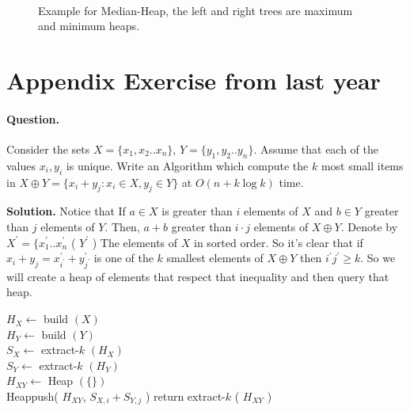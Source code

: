 \begin{figure}[h]
  \centering
  \begin{subfigure}[b]{0.9\textwidth}
	
  \end{subfigure}
  \\ 
\begin{subfigure}[b]{0.9\textwidth}
	
  \end{subfigure}
  \caption{ Example for Median-Heap, the left and right trees are maximum and minimum heaps.  }
\end{figure}

\newpage



\section{ Appendix Exercise from last year }

\paragraph{Question.} Consider the sets $X = \{x_1,x_2 .. x_n\}$, $Y = \{y_1, y_2 .. y_n\}$. Assume that each of the values $x_i,y_i$ is unique. Write an Algorithm which compute the $k$ most small items in $X \oplus Y = \{ x_{i} + y_{j} : x_{i} \in X , y_{j} \in Y  \} $ at $ O \left( n + k\log k  \right) $ time. 

\textbf{Solution.} Notice that If $a \in X$ is greater than $i$ elements of $X$ and $b \in Y$ greater than $j$ elements of $Y$. Then, $a + b$  greater than $i\cdot j$ elements of $X \oplus Y$. Denote by $X^\prime = \{ x^{\prime}_{1} .. x^{\prime}_{n}$ ( $Y^{\prime}$ ) The elements of $X$ in sorted order. So it's clear that if $x_{i}+y_{j} = x^{\prime}_{i^{\prime}} + y^{\prime}_{j^{\prime}}$ is one of the $k$ smallest elements of $X\oplus Y$ then $i^{\prime}j^{\prime} \ge k$. So we will create a heap of elements that respect that inequality and then query that heap.

\begin{algorithm}
$ H_{X} \leftarrow $ build $\left( X \right)$  \\ 
$ H_{Y} \leftarrow $ build $\left( Y \right)$  \\
$ S_{X} \leftarrow $ extract-$k$ $\left( H_{X} \right)$  \\ 
$ S_{Y} \leftarrow $ extract-$k$ $\left( H_{Y} \right)$  \\
$ H_{XY} \leftarrow $ Heap $(\{ \} )$ \\
 {
   {
  	Heappush( $H_{XY}$, $S_{X,i} + S_{Y, j}$ )    
  }
}
return extract-$k$ ( $H_{XY}$ ) 
\end{algorithm}


\newpage

\fi





